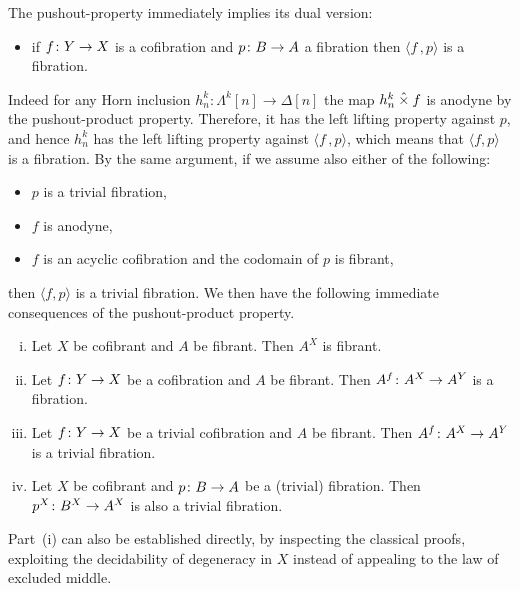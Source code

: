 \documentclass[reqno,10pt,a4paper,oneside,draft]{amsart}
\begin{document}
The pushout-property immediately implies its dual version: 
\begin{itemize}
\item if $f \colon Y \to X$ is a cofibration and $p \colon B \to A$ a fibration then $\langle f \, , p \rangle$ is a fibration.
\end{itemize}
 Indeed for any Horn inclusion $h^k_n: \Lambda^k[n] \rightarrow \Delta[n]$ the map $h^k_n \mathbin{\hat{\times}} f$ is anodyne by the pushout-product property. Therefore,  it has the left lifting property against $p$, and hence $h^k_n$ has the left lifting property against $\langle f \, , p  \rangle$, which means that   $\langle f, p \rangle$ is a fibration. By the same argument, if we  assume also either of the following:
\begin{itemize}
\item $p$ is a trivial fibration,
\item $f$ is anodyne,
\item $f$ is an acyclic cofibration and the codomain of $p$ is fibrant,
\end{itemize}
then $\langle f , p \rangle$ is a trivial fibration.  We then have the following immediate consequences of the pushout-product property.



\begin{proposition} \hfill 
 \label{thm:exponentials}
\begin{enumerate}[(i)] 
\item Let $X$ be cofibrant and $A$ be fibrant.  Then $A^X$ is fibrant.
\item Let $f \colon Y \rightarrow X$ be a cofibration and $A$ be fibrant. Then $A^f \colon A^X \rightarrow A^Y$ is a fibration.
\item Let $f \colon Y \rightarrow X$ be a trivial cofibration and $A$ be fibrant.  Then $A^f \colon A^X \rightarrow A^Y$ is a trivial fibration.
\item Let $X$ be cofibrant and $p \colon B \rightarrow A$ be a (trivial) fibration. Then $p^X \colon B^X \rightarrow A^X$ is also a trivial fibration.
\end{enumerate}
\end{proposition}

Part~(i) can also be established directly, by inspecting the classical proofs, exploiting the decidability of degeneracy in $X$ instead of appealing to the law of excluded middle.
\end{document}
